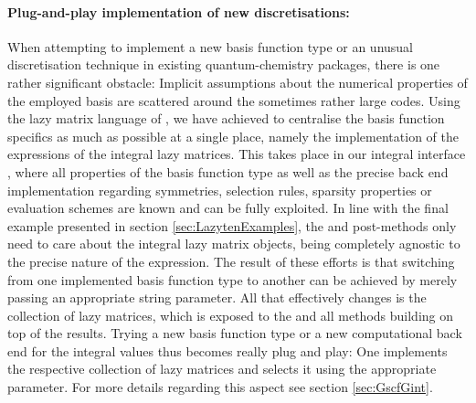 \paragraph{Plug-and-play implementation of new discretisations:}
When attempting to implement a new basis function type or an unusual discretisation technique
in existing quantum-chemistry packages,
there is one rather significant obstacle:
Implicit assumptions about the numerical properties of the employed basis
are scattered around the sometimes rather large codes.
Using the lazy matrix language of \lazyten,
we have achieved to centralise the basis function specifics as much as possible
at a single place,
namely the implementation of the \contraction expressions
of the integral lazy matrices.
This takes place in our integral interface \gint,
where all properties of the basis function type
as well as the precise back end implementation
regarding symmetries, selection rules, sparsity properties
or evaluation schemes are known and can be fully exploited.
In line with the final example presented in section \vref{sec:LazytenExamples},
the \SCF and post-\HF methods only need to care about the
integral lazy matrix objects,
being completely agnostic to the precise nature of the \contraction expression.
The result of these efforts is that switching from one implemented
basis function type to another can be achieved by merely passing
an appropriate string parameter.
All that effectively changes is the collection of lazy matrices,
which is exposed to the \SCF and all methods building on top
of the \SCF results.
Trying a new basis function type
or a new computational back end for the integral values
thus becomes really plug and play:
One implements the respective collection of lazy matrices and selects
it using the appropriate parameter.
For more details regarding this aspect see section \vref{sec:GscfGint}.
%
%

